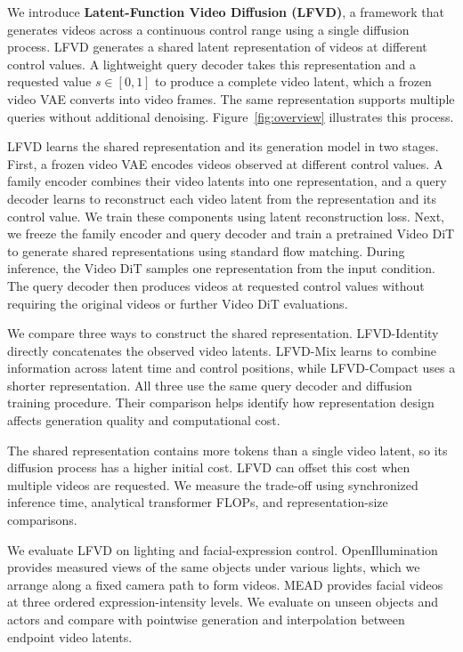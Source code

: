 We introduce \textbf{Latent-Function Video Diffusion (LFVD)}, a framework
that generates videos across a continuous control range using a single
diffusion process. LFVD generates a shared latent representation of videos
at different control values. A lightweight query decoder takes this
representation and a requested value $s\in[0,1]$ to produce a complete
video latent, which a frozen video VAE converts into video frames. The
same representation supports multiple queries without additional
denoising. Figure~\ref{fig:overview} illustrates this process.

LFVD learns the shared representation and its generation model in two
stages. First, a frozen video VAE encodes videos observed at different
control values. A family encoder combines their video latents into one
representation, and a query decoder learns to reconstruct each video latent
from the representation and its control value. We train these components
using latent reconstruction loss. Next, we freeze the family encoder and
query decoder and train a pretrained Video DiT to generate shared
representations using standard flow matching. During inference, the Video
DiT samples one representation from the input condition. The query decoder
then produces videos at requested control values without requiring the
original videos or further Video DiT evaluations.

We compare three ways to construct the shared representation.
LFVD-Identity directly concatenates the observed video latents.
LFVD-Mix learns to combine information across latent time and control
positions, while LFVD-Compact uses a shorter representation. All three
use the same query decoder and diffusion training procedure. Their
comparison helps identify how representation design affects generation
quality and computational cost.

The shared representation contains more tokens than a single video latent,
so its diffusion process has a higher initial cost. LFVD can offset this
cost when multiple videos are requested. We measure the trade-off using
synchronized inference time, analytical transformer FLOPs, and
representation-size comparisons.

We evaluate LFVD on lighting and facial-expression control.
OpenIllumination provides measured views of the same objects under
various lights, which we arrange along a fixed camera path to form videos.
MEAD provides facial videos at three ordered expression-intensity levels.
We evaluate on unseen objects and actors and compare with pointwise
generation and interpolation between endpoint video latents.


